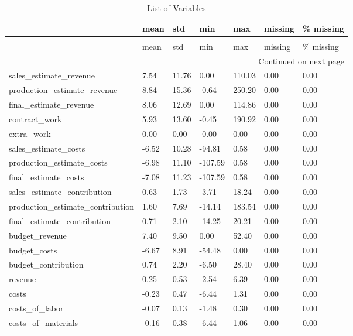 \begin{landscape}\begin{longtable}[h!]{lllllll}
\caption{List of Variables} \label{eda_1} \\
\toprule
 & mean & std & min & max & missing & \% missing \\
\midrule
\endfirsthead
\caption[]{List of Variables} \\
\toprule
 & mean & std & min & max & missing & \% missing \\
\midrule
\endhead
\midrule
\multicolumn{7}{r}{Continued on next page} \\
\midrule
\endfoot
\bottomrule
\endlastfoot
sales_estimate_revenue & 7.54 & 11.76 & 0.00 & 110.03 & 0.00 & 0.00 \\
production_estimate_revenue & 8.84 & 15.36 & -0.64 & 250.20 & 0.00 & 0.00 \\
final_estimate_revenue & 8.06 & 12.69 & 0.00 & 114.86 & 0.00 & 0.00 \\
contract_work & 5.93 & 13.60 & -0.45 & 190.92 & 0.00 & 0.00 \\
extra_work & 0.00 & 0.00 & -0.00 & 0.00 & 0.00 & 0.00 \\
sales_estimate_costs & -6.52 & 10.28 & -94.81 & 0.58 & 0.00 & 0.00 \\
production_estimate_costs & -6.98 & 11.10 & -107.59 & 0.58 & 0.00 & 0.00 \\
final_estimate_costs & -7.08 & 11.23 & -107.59 & 0.58 & 0.00 & 0.00 \\
sales_estimate_contribution & 0.63 & 1.73 & -3.71 & 18.24 & 0.00 & 0.00 \\
production_estimate_contribution & 1.60 & 7.69 & -14.14 & 183.54 & 0.00 & 0.00 \\
final_estimate_contribution & 0.71 & 2.10 & -14.25 & 20.21 & 0.00 & 0.00 \\
budget_revenue & 7.40 & 9.50 & 0.00 & 52.40 & 0.00 & 0.00 \\
budget_costs & -6.67 & 8.91 & -54.48 & 0.00 & 0.00 & 0.00 \\
budget_contribution & 0.74 & 2.20 & -6.50 & 28.40 & 0.00 & 0.00 \\
revenue & 0.25 & 0.53 & -2.54 & 6.39 & 0.00 & 0.00 \\
costs & -0.23 & 0.47 & -6.44 & 1.31 & 0.00 & 0.00 \\
costs_of_labor & -0.07 & 0.13 & -1.48 & 0.30 & 0.00 & 0.00 \\
costs_of_materials & -0.16 & 0.38 & -6.44 & 1.06 & 0.00 & 0.00 \\

\end{longtable}
\end{landscape}
